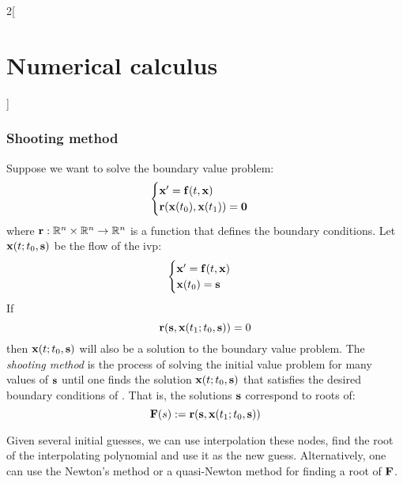 \documentclass[../../../main_math.tex]{subfiles}
\begin{document}
\begin{multicols}{2}[\section{Numerical calculus}]
  \subsubsection{Shooting method}
  \begin{definition}
    Suppose we want to solve the boundary value problem:
    \begin{equation}\label{NC:bvp}
      \begin{cases}
        \boldsymbol{\mathrm{x}}' =\boldsymbol{\mathrm{f}}(t, \boldsymbol{\mathrm{x}}) \\
        \boldsymbol{\mathrm{r}}(\boldsymbol{\mathrm{x}}(t_0), \boldsymbol{\mathrm{x}}(t_1))=\boldsymbol{\mathrm{0}}
      \end{cases}
    \end{equation}
    where $\boldsymbol{\mathrm{r}}: \mathbb{R}^n\times\mathbb{R}^n\rightarrow\mathbb{R}^n$ is a function that defines the boundary conditions.
    Let $\boldsymbol{\mathrm{x}}(t;t_0,\boldsymbol{\mathrm{s}})$ be the flow of the ivp:
    \begin{equation*}
      \begin{cases}
        \boldsymbol{\mathrm{x}}' =\boldsymbol{\mathrm{f}}(t, \boldsymbol{\mathrm{x}}) \\
        \boldsymbol{\mathrm{x}}(t_0)=\boldsymbol{\mathrm{s}}
      \end{cases}
    \end{equation*}
    If
    \begin{equation}\label{NC:eq_shooting_bound}
      \boldsymbol{\mathrm{r}}(\boldsymbol{\mathrm{s}}, \boldsymbol{\mathrm{x}}(t_1;t_0,\boldsymbol{\mathrm{s}}))=0
    \end{equation}
    then $\boldsymbol{\mathrm{x}}(t;t_0,\boldsymbol{\mathrm{s}})$ will also be a solution to the boundary value problem. The \emph{shooting method} is the process of solving the initial value problem for many values of $\boldsymbol{\mathrm{s}}$ until one finds the solution $\boldsymbol{\mathrm{x}}(t;t_0,\boldsymbol{\mathrm{s}})$ that satisfies the desired boundary conditions of . That is, the solutions $\boldsymbol{\mathrm{s}}$ correspond to roots of:
    $$
      \boldsymbol{\mathrm{F}}(s):=\boldsymbol{\mathrm{r}}(\boldsymbol{\mathrm{s}},\boldsymbol{\mathrm{x}}(t_1;t_0,\boldsymbol{\mathrm{s}}))
    $$
  \end{definition}
  \begin{remark}
    Given several initial guesses, we can use interpolation these nodes, find the root of the interpolating polynomial and use it as the new guess. Alternatively, one can use the Newton's method or a quasi-Newton method for finding a root of $\boldsymbol{\mathrm{F}}$.
  \end{remark}

\end{multicols}
\end{document}
